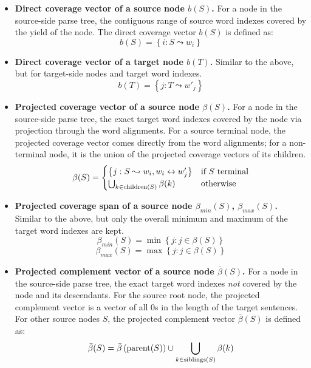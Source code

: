 \documentclass{article}
\begin{document}
\begin{itemize}

\item {\bf Direct coverage vector of a source node $b(S)$.}  For a node in the source-side parse tree, the contiguous range of source word indexes covered by the yield of the node.  The direct coverage vector $b(S)$ is defined as:
\begin{equation}
    b(S) = \left\{ i : S \leadsto w_i \right\}
\end{equation}

\item {\bf Direct coverage vector of a target node $b(T)$.}  Similar to the above, but for target-side nodes and target word indexes.
\begin{equation}
    b(T) = \left\{ j : T \leadsto w'_j \right\}
\end{equation}

\item {\bf Projected coverage vector of a source node $\beta(S)$.}  For a node in the source-side parse tree, the exact target word indexes covered by the node via projection through the word alignments.  For a source terminal node, the projected coverage vector comes directly from the word alignments; for a non-terminal node, it is the union of the projected coverage vectors of its children.
\begin{equation} \label{Eqn-ProjCovVector}
    \beta(S) =
    \begin{cases}
        \left\{ j : S \leadsto w_i, w_i \leftrightarrow w'_j \right\}
        & \text{if $S$ terminal} \\
        \bigcup_{k \in {\rm children}(S)} \beta(k) & {\rm otherwise} \\
    \end{cases}
\end{equation}

\item {\bf Projected coverage span of a source node $\beta_{min}(S)$, $\beta_{max}(S)$.}  Similar to the above, but only the overall minimum and maximum of the target word indexes are kept.
\begin{equation}
    \beta_{min}(S) = \min \left\{ j : j \in \beta(S) \right\}
\end{equation}
\begin{equation}
    \beta_{max}(S) = \max \left\{ j : j \in \beta(S) \right\}
\end{equation}

\item {\bf Projected complement vector of a source node $\bar{\beta}(S)$.}  For a node in the source-side parse tree, the exact target word indexes {\it not} covered by the node and its descendants.  For the source root node, the projected complement vector is a vector of all 0s in the length of the target sentences.  For other source nodes $S$, the projected complement vector $\bar{\beta}(S)$ is defined as:
\begin{equation} \label{Eqn-ProjCompVector}
    \bar{\beta}(S) = \bar{\beta}\left( {\rm parent}(S) \right) \cup \bigcup_{k \in {\rm siblings}(S)} \beta(k)
\end{equation}


\end{itemize}
\end{document}

